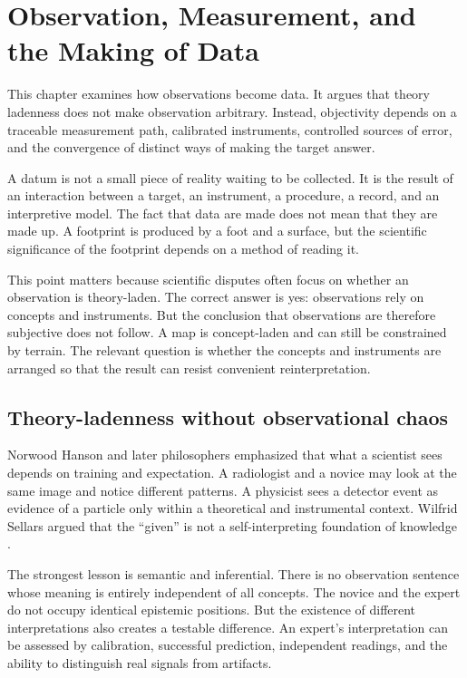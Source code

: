\chapter{Observation, Measurement, and the Making of Data}
\label{ch:observation}

\begin{chapterguide}
This chapter examines how observations become data. It argues that theory
ladenness does not make observation arbitrary. Instead, objectivity depends on
a traceable measurement path, calibrated instruments, controlled sources of
error, and the convergence of distinct ways of making the target answer.
\end{chapterguide}

A datum is not a small piece of reality waiting to be collected. It is the
result of an interaction between a target, an instrument, a procedure, a
record, and an interpretive model. The fact that data are made does not mean
that they are made up. A footprint is produced by a foot and a surface, but
the scientific significance of the footprint depends on a method of reading
it.

This point matters because scientific disputes often focus on whether an
observation is theory-laden. The correct answer is yes: observations rely on
concepts and instruments. But the conclusion that observations are therefore
subjective does not follow. A map is concept-laden and can still be constrained
by terrain. The relevant question is whether the concepts and instruments are
arranged so that the result can resist convenient reinterpretation.

\section{Theory-ladenness without observational chaos}

Norwood Hanson and later philosophers emphasized that what a scientist sees
depends on training and expectation. A radiologist and a novice may look at
the same image and notice different patterns. A physicist sees a detector event
as evidence of a particle only within a theoretical and instrumental context.
Wilfrid Sellars argued that the \enquote{given} is not a self-interpreting
foundation of knowledge \citep{sellars1963}.

The strongest lesson is semantic and inferential. There is no observation
sentence whose meaning is entirely independent of all concepts. The novice and
the expert do not occupy identical epistemic positions. But the existence of
different interpretations also creates a testable difference. An expert's
interpretation can be assessed by calibration, successful prediction,
independent readings, and the ability to distinguish real signals from
artifacts.

